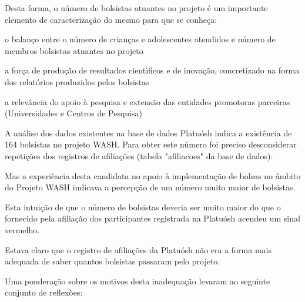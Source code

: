 \documentclass[
12pt,		%
openright,	%
twoside,  %
a4paper,			%
chapter=TITLE,		%
english,			%
french,				%
spanish,			%
brazil				%
]{USPSC-classe/USPSC}
\begin{document}
Desta forma, o n\'umero de bolsistas atuantes no projeto \'e um importante elemento de caracteriza\c{c}\~ao do mesmo para que se conhe\c{c}a:



\begin{alineas}
\item o balan\c{c}o entre o n\'umero de crian\c{c}as e adolescentes atendidos e n\'umero de membros bolsistas atuantes no projeto
\item a for\c{c}a de produ\c{c}\~ao de resultados cient\'{\i}ficos e de inova\c{c}\~ao, concretizado na forma dos relat\'orios produzidos pelos bolsistas
\item a relev\^ancia do apoio \`a pesquisa e extens\~ao das entidades promotoras parceiras (Universidades e Centros de Pesquisa)
\end{alineas}

A an\'alise dos dados existentes na base de dados Platu\'osh indica a exist\^encia de 164 bolsistas no projeto WASH. Para obter este n\'umero foi preciso desconsiderar repeti\c{c}\~oes dos registros de afilia\c{c}\~oes (tabela "afiliacoes" da base de dados).


Mas a experi\^encia desta candidata no apoio \`a implementa\c{c}\~ao de bolsas no \^ambito do Projeto WASH indicava a percep\c{c}\~ao de um n\'umero muito maior de bolsistas.


Esta intui\c{c}\~ao de que o n\'umero de bolsistas deveria ser muito maior do que o fornecido pela afilia\c{c}\~ao dos participantes registrada na Platu\'osh acendeu um sinal vermelho.


Estava claro que o registro de afilia\c{c}\~oes da Platu\'osh n\~ao era a forma mais adequada de saber quantos bolsistas passaram pelo projeto.





Uma pondera\c{c}\~ao sobre os motivos desta inadequa\c{c}\~ao levaram ao seguinte conjunto de reflex\~oes:
\end{document}

